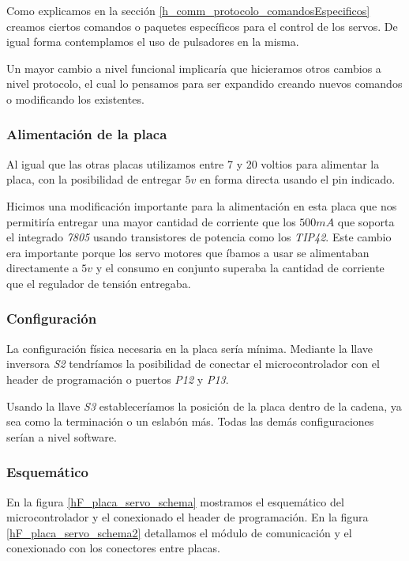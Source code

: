 Como explicamos en la secci\'on \ref{h_comm_protocolo_comandosEspecificos} creamos ciertos comandos
o paquetes espec\'ificos para el control de los servos.
De igual forma contemplamos el uso de pulsadores en la misma.

Un mayor cambio a nivel funcional implicar\'ia que hicieramos otros cambios a nivel protocolo, el cual
lo pensamos para ser expandido creando nuevos comandos o modificando los existentes.

\subsubsection{Alimentaci\'on de la placa}
\label{h_placas_servos_alimentacion}

Al igual que las otras placas utilizamos entre 7 y 20 voltios para alimentar la placa, con la posibilidad
de entregar $5v$ en forma directa usando el pin indicado.

Hicimos una modificaci\'on importante para la alimentaci\'on en esta placa que nos permitir\'ia entregar
una mayor cantidad de corriente que los $500 mA$ que soporta el integrado \emph{7805} usando transistores
de potencia como los \emph{TIP42}.
Este cambio era importante porque los servo motores que \'ibamos a usar se alimentaban directamente a $5v$
y el consumo en conjunto superaba la cantidad de corriente que el regulador de tensi\'on entregaba.

\subsubsection{Configuraci\'on}
\label{h_placas_servos_config}

La configuraci\'on f\'isica necesaria en la placa ser\'ia m\'inima.
Mediante la llave inversora \emph{S2} tendr\'iamos la posibilidad de conectar el microcontrolador
con el header de programaci\'on o puertos \emph{P12} y \emph{P13}.

Usando la llave \emph{S3} establecer\'iamos la posici\'on de la placa dentro de la cadena, ya sea
como la terminaci\'on o un eslab\'on m\'as.
Todas las dem\'as configuraciones ser\'ian a nivel software.

\subsubsection{Esquem\'atico}
\label{h_placas_servos_esquematico}

En la figura \ref{hF_placa_servo_schema} mostramos el esquem\'atico del microcontrolador y el conexionado
el header de programaci\'on.
En la figura \ref{hF_placa_servo_schema2} detallamos el m\'odulo de comunicaci\'on y el conexionado con
los conectores entre placas.

